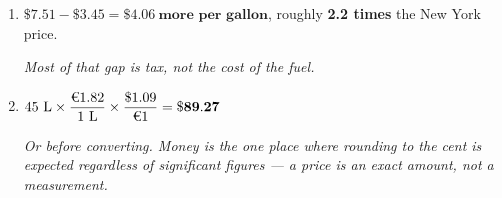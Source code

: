 \documentclass[12pt, twoside]{article}
\begin{document}
\begin{enumerate}[itemsep=0.25cm]
\begin{enumerate}[itemsep=0.15cm]
      $1.82~\dfrac{\text{\texteuro}}{\text{L}}
      \times \dfrac{\$1.09}{\text{\texteuro}1}
      \times \dfrac{3.785~\text{L}}{1~\text{gal}}
      = 1.82 \times 1.09 \times 3.785~\dfrac{\$}{\text{gal}} = 7.5086\ldots
      \approx \mathbf{\$7.51~\textbf{per gallon}}$

      \emph{Set the factors up so the euros cancel and the liters cancel, leaving dollars
      over gallons. If the answer comes out near \$0.44, one of the two factors was
      inverted --- and the units in the cancelling will show which.}
    \item $\$7.51 - \$3.45 = \mathbf{\$4.06~\textbf{more per gallon}}$, roughly
      \textbf{2.2 times} the New York price.

      \emph{Most of that gap is tax, not the cost of the fuel.}
    \item $45~\text{L} \times \dfrac{\text{\texteuro}1.82}{1~\text{L}}
      \times \dfrac{\$1.09}{\text{\texteuro}1} = \mathbf{\$89.27}$

      \emph{Or  before converting. Money is the one place where rounding to
      the cent is expected regardless of significant figures --- a price is an exact
      amount, not a measurement.}
  \end{enumerate}

\end{enumerate}
\end{document}
